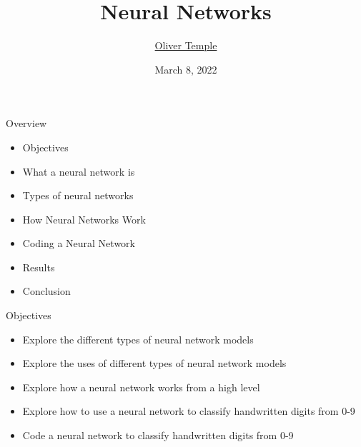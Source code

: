 \documentclass{beamer}
\title{Neural Networks}
\author{\href{mailto:olivertemple@exe-coll.ac.uk}{Oliver Temple}}
\date{March 8, 2022}
\begin{document}
\maketitle
\begin{frame}{Overview}
    \begin{itemize}
        \item Objectives
        \item What a neural network is
        \item Types of neural networks
        \item How Neural Networks Work
        \item Coding a Neural Network
        \item Results
        \item Conclusion
    \end{itemize}
\end{frame}

\begin{frame}{Objectives}
    \begin{itemize}
        \item Explore the different types of neural network models
        \item Explore the uses of different types of neural network models
        \item Explore how a neural network works from a high level
        \item Explore how to use a neural network to classify handwritten digits from 0-9
        \item Code a neural network to classify handwritten digits from 0-9
    \end{itemize}
\end{frame}
\end{document}
